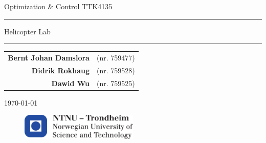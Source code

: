 
\begin{titlepage}
    \begin{center}
    	\large
    	Optimization \& Control TTK4135
    \end{center}
    \vspace{\fill}
    \rule{\linewidth}{0.5mm}
    \begin{center}
    	\huge
    	Helicopter Lab
    \end{center}
	\rule{\linewidth}{0.5mm}
	\vspace{\fill}

    \large
    \centering
    \begin{table}[H]
    	\centering
    	\large
    	\begin{tabular}{rl}
            \textbf{Bernt Johan Damslora} & (nr. 759477) \\
    		\textbf{Didrik Rokhaug} &  (nr. 759528)\\
            \textbf{Dawid Wu} & (nr. 759525)
    	\end{tabular}
    \end{table}
    \vspace{\fill}
    \begin{center}
    	\large
    	\today
    \end{center}
	\vspace{\fill}
    \begin{figure}[H]
    \centering
    \includegraphics[width=0.5\textwidth]{logontnu_eng}
    \end{figure}
    \thispagestyle{empty}
\end{titlepage}

